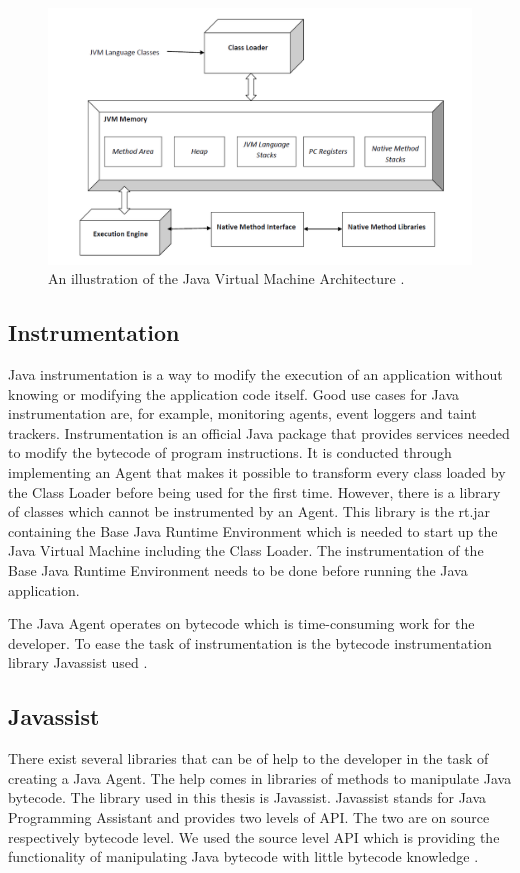 \begin{figure}[H]
  \centering
  \includegraphics[width=\textwidth]{images/JvmSpec7.png}
  \caption{An illustration of the Java Virtual Machine Architecture \parencite{jvm}. }
  \label{fig:JVM}
\end{figure}


\subsection{Instrumentation}
\label{Instrumentation}
Java instrumentation is a way to modify the execution of an application without knowing or modifying the application code itself. Good use cases for Java instrumentation are, for example, monitoring agents, event loggers and taint trackers. Instrumentation is an official Java package that provides services needed to modify the bytecode of program instructions. It is conducted through implementing an Agent that makes it possible to transform every class loaded by the Class Loader before being used for the first time. However, there is a library of classes which cannot be instrumented by an Agent. This library is the rt.jar containing the Base Java Runtime Environment which is needed to start up the Java Virtual Machine including the Class Loader. The instrumentation of the Base Java Runtime Environment needs to be done before running the Java application.

The Java Agent operates on bytecode which is time-consuming work for the developer. To ease the task of instrumentation is the bytecode instrumentation library Javassist used \parencite{Java_Instrument, Javassist}.



\subsection{Javassist}
There exist several libraries that can be of help to the developer in the task of creating a Java Agent. The help comes in libraries of methods to manipulate Java bytecode. The library used in this thesis is Javassist. Javassist stands for Java Programming Assistant and provides two levels of API. The two are on source respectively bytecode level. We used the source level API which is providing the functionality of manipulating Java bytecode with little bytecode knowledge \parencite{Javassist}.

